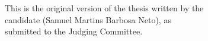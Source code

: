 \documentclass[11pt,twoside,a4paper]{book}
\begin{document}
    \vskip 2cm

    \begin{flushright}
    This is the original version of the thesis written by the\\
    candidate (Samuel Martins Barbosa Neto), as\\
    submitted to the Judging Committee.
    \end{flushright}

\pagebreak


%
%
%
%
%
\end{document}
